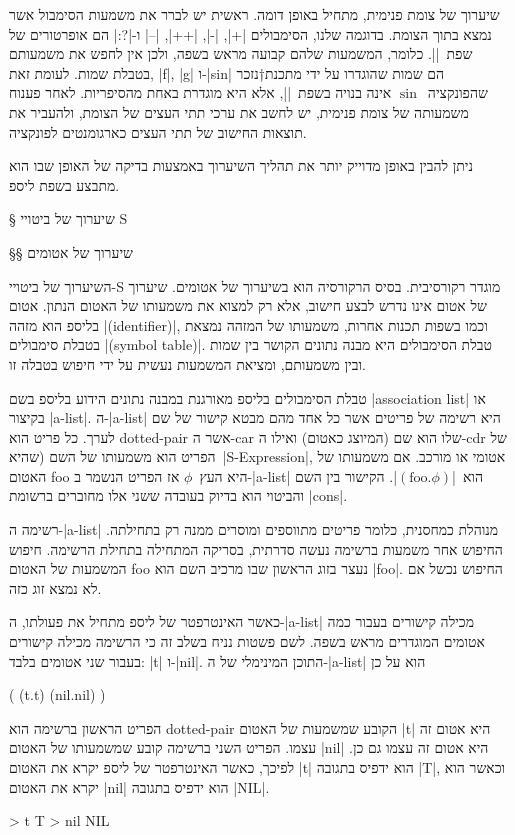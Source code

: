 שיערוך של צומת פנימית, מתחיל באופן דומה. ראשית יש לברר את משמעות הסימבול אשר
נמצא בתוך הצומת. בדוגמה שלנו, הסימבולים \T|+|, \T|-|, \T|++|, \T|--| ו-\T|?:|
הם אופרטורים של שפת~\E|\CPL|. כלומר, המשמעות שלהם קבועה מראש בשפה, ולכן אין לחפש את
משמעותם בטבלת שמות. לעומת זאת, \T|f|, \T|g| ו-\T|sin| הם שמות שהוגדרו על ידי
מתכנת†{נזכר שהפונקציה~$\sin$ אינה בנויה בשפת~\E|\CPL|, אלא היא מוגדרת באחת
מהסיפריות.} לאחר פענוח משמעותה של צומת פנימית, יש לחשב את ערכי תתי העצים של
הצומת, ולהעביר את תוצאות החישוב של תתי העצים כארגומנטים לפונקציה.

ניתן להבין באופן מדוייק יותר את תהליך השיערוך באמצעות בדיקה של האופן שבו הוא
מתבצע בשפת ליספ.

§ שיערוך של ביטויי S

§§ שיערוך של אטומים

השיערוך של ביטויי-S מוגדר רקורסיבית. בסיס הרקורסיה הוא בשיערוך של אטומים.
שיערוך של אטום אינו נדרש לבצע חישוב, אלא רק למצוא את משמעותו של האטום הנתון.
אטום בליספ הוא מזהה \E|(identifier)|, וכמו בשפות תכנות אחרות, משמעותו של המזהה
נמצאת בטבלת סימבולים \E|(symbol table)|. טבלת הסימבולים היא מבנה נתונים הקושר בין
שמות ובין משמעותם, ומציאת המשמעות נעשית על ידי חיפוש בטבלה זו.

טבלת הסימבולים בליספ מאורגנת במבנה נתונים הידוע בליספ בשם \E|association list| או
בקיצור \E|a-list|. ה-\E|a-list| היא רשימה של פריטים אשר כל אחד מהם מבטא קישור
של שם לערך. כל פריט הוא dotted-pair אשר ה-car שלו הוא שם
(המיוצג כאטום) ואילו ה-cdr של הפריט הוא משמעותו של השם (שהיא~\E|S-Expression|,
אטומי או מורכב. אם משמעותו של האטום foo היא העץ~$ϕ$ אז הפריט הנשמר ב-\E|a-list|
הוא~\E|$(\text{foo}.ϕ)$|. הקישור בין השם והביטוי הוא בדיוק בעובדה ששני אלו מחוברים
ברשומת \E|cons|.

רשימה ה-\E|a-list| מנוהלת כמחסנית, כלומר פריטים מתווספים ומוסרים ממנה רק
בתחילתה. החיפוש אחר משמעות ברשימה נעשה סדרתית, בסריקה המתחילה בתחילת הרשימה.
חיפוש המשמעות של האטום foo נעצר בזוג הראשון שבו מרכיב השם הוא \E|foo|. החיפוש
נכשל אם לא נמצא זוג כזה.

כאשר האינטרפטר של ליספ מתחיל את פעולתו, ה-\E|a-list| מכילה קישורים בעבור כמה
אטומים המוגדרים מראש בשפה. לשם פשטות נניח בשלב זה כי הרשימה מכילה קישורים בעבור
שני אטומים בלבד: \E|t| ו-\E|nil|.
התוכן המינימלי של ה-\E|a-list| הוא על כן
\begin{LISP}
(
  (t.t)
  (nil.nil)
)
\end{LISP}

הפריט הראשון ברשימה הוא dotted-pair הקובע שמשמעות של האטום \T|t| היא אטום זה
עצמו. הפריט השני ברשימה קובע שמשמעותו של האטום \T|nil| היא אטום זה עצמו גם כן.
לפיכך, כאשר האינטרפטר של ליספ יקרא את האטום \T|t| הוא ידפיס בתגובה \T|T|, וכאשר
הוא יקרא את האטום \T|nil| הוא ידפיס בתגובה \T|NIL|.
\begin{LISP}
> t
T
> nil
NIL
\end{LISP}

